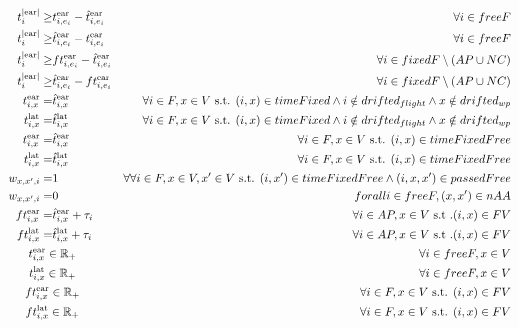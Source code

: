 \documentclass[../thesis.tex]{subfiles}
\begin{document}
{\begin{align}
t^\text{|ear|}_i\geq& t^\text{ear}_{i,e_i} - \hat t^\text{ear}_{i,e_i} &\forall i\in freeF\\
t^\text{|ear|}_i\geq& \hat t^\text{ear}_{i,e_i} - t^\text{ear}_{i,e_i} &\forall i\in freeF\\
t^\text{|ear|}_i\geq& ft^\text{ear}_{i,e_i} - \hat t^\text{ear}_{i,e_i} &\forall i\in fixedF\setminus (AP\cup NC)\\
t^\text{|ear|}_i\geq& \hat t^\text{ear}_{i,e_i} - ft^\text{ear}_{i,e_i} &\forall i\in fixedF\setminus (AP\cup NC)\\
t^\text{ear}_{i,x} =& \hat t^\text{ear}_{i,x}& \forall i\in F, x\in V\text { s.t. } (i,x)\in timeFixed \land i\notin drifted_{flight}\land x\notin drifted_{wp} \\
t^\text{lat}_{i,x} =& \hat t^\text{lat}_{i,x}& \forall i\in F, x\in V\text { s.t. } (i,x)\in timeFixed \land i\notin drifted_{flight}\land x\notin drifted_{wp} \\
t^\text{ear}_{i,x} =& \hat t^\text{ear}_{i,x}& \forall i\in F, x\in V\text { s.t. } (i,x)\in timeFixedFree \\
t^\text{lat}_{i,x} =& \hat t^\text{lat}_{i,x}& \forall i\in F, x\in V\text { s.t. } (i,x)\in timeFixedFree \\
w_{x,x',i} =& 1 &\forall  \forall i\in F, x\in V,x'\in V\text { s.t. } (i,x')\in timeFixedFree \land (i,x,x')\in passedFree\\
w_{x,x',i}=&0&forall i\in freeF, (x,x')\in nAA\\
ft^\text{ear}_{i,x} =& \hat t^\text{ear}_{i,x} + \tau_i &\forall i\in AP, x\in V \text{ s.t .} (i,x)\in FV\\ 
ft^\text{lat}_{i,x} =& \hat t^\text{lat}_{i,x} + \tau_i &\forall i\in AP, x\in V\text{ s.t .} (i,x)\in FV\\ 
%
%
%
%
&\mathclap{t^\text{ear}_{i,x} \in \mathbb{R}_+}&\forall i\in freeF,x\in V \nonumber \\
&\mathclap{t^\text{lat}_{i,x} \in \mathbb{R}_+}&\forall i\in freeF,x\in V \nonumber \\
&\mathclap{ft^\text{ear}_{i,x} \in \mathbb{R}_+}&\forall i\in F,x\in V\text{ s.t. } (i,x)\in FV \nonumber \\
&\mathclap{ft^\text{lat}_{i,x} \in \mathbb{R}_+}&\forall i\in F,x\in V\text{ s.t. } (i,x)\in FV \nonumber \\

\end{align}}
\end{document}
